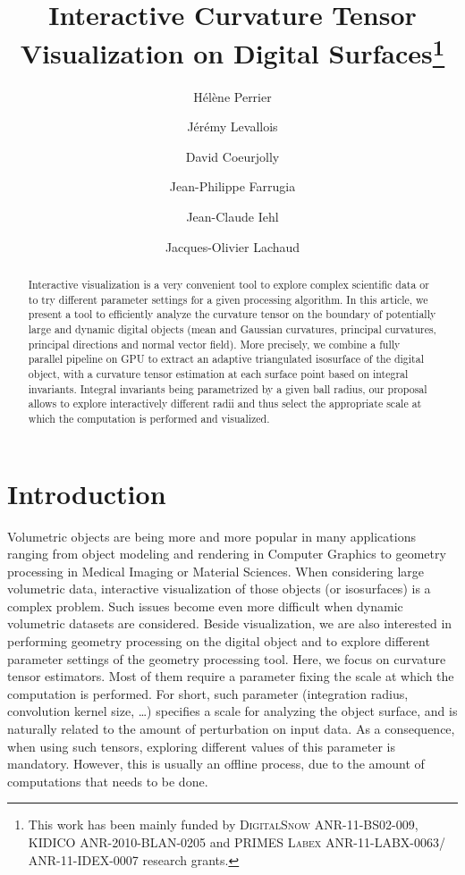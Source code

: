 \documentclass{llncs}
\title{Interactive Curvature Tensor Visualization on Digital
Surfaces\thanks{This work has been mainly funded by \textsc{DigitalSnow}
ANR-11-BS02-009, \textsc{KIDICO} ANR-2010-BLAN-0205 and \textsc{PRIMES Labex}
ANR-11-LABX-0063/ ANR-11-IDEX-0007 research grants.}}
\author{H\'el\`ene Perrier\inst{1}\and J\'er\'emy Levallois\inst{1,2}\and David
Coeurjolly\inst{1}\and Jean-Philippe Farrugia\inst{1}\and Jean-Claude
Iehl\inst{1}\and Jacques-Olivier Lachaud\inst{2} }
\institute{ Universit\'e de Lyon, CNRS\\
   LIRIS, UMR5205, F-69621, France
   \and
Universit\'e de Savoie Mont Blanc, CNRS\\
LAMA, UMR5127, F-73776, France\\
}
\begin{document}
\maketitle


\begin{abstract}\sloppy
  Interactive visualization is a very convenient tool to explore
  complex scientific data or to try different parameter settings
  for a given processing algorithm. In this article, we present a tool
  to efficiently analyze the curvature tensor on the boundary of
  potentially large and dynamic digital objects (mean and Gaussian curvatures,
  principal curvatures, principal directions and normal vector
  field). More precisely, we combine a fully parallel pipeline on GPU
  to extract an adaptive triangulated isosurface of the digital
  object, with a curvature tensor estimation at each surface point
  based on integral invariants. Integral invariants being parametrized
  by a given ball radius, our proposal allows to explore
  interactively different radii and thus select the appropriate scale
  at which the computation is performed and visualized.

\end{abstract}

\section{Introduction}
\label{sec:introduction}

Volumetric objects are being more and more popular in many
applications ranging from object modeling and rendering in Computer
Graphics to geometry processing in Medical Imaging or Material
Sciences. When considering large volumetric data, interactive
visualization of those objects (or isosurfaces) is a complex
problem. Such issues become even more difficult when dynamic
volumetric datasets are considered. Beside
visualization, we are also interested in performing geometry
processing on the digital object and to explore different parameter
settings of the geometry processing tool.
\color{blue}
Here, we focus on curvature tensor estimators.
Most of them require a parameter fixing the scale
at which the computation is performed. For short, such parameter
(integration radius, convolution kernel size, \ldots) specifies a scale for analyzing the object surface, 
and is naturally related to the amount of perturbation on input data. As a consequence, when using
such tensors, exploring different values of this parameter is mandatory.
However, this is usually an offline process, due to the amount of computations that
needs to be done.
\normalcolor
\end{document}
